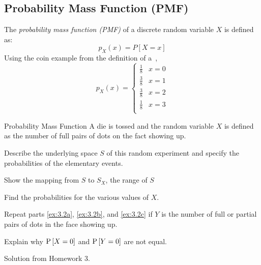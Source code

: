 	\subsection{Probability Mass Function  (PMF)} \label{subsec:Probability Mass Function}
		\begin{definition} \label{def:Probability Mass Function}
			The \emph{probability mass function (PMF)} of a discrete random variable $X$ is defined as:
			\begin{equation} \label{eq:Probability Mass Function}
				p_{X} \left( x \right) = P \left[ X=x \right]
			\end{equation}
			Using the coin example from the definition of a~,
			\begin{equation}
				p_{X} \left( x \right) = 
				\begin{cases}
					\frac{1}{8} & x=0 \\
					\frac{3}{8} & x=1 \\
					\frac{3}{8} & x=2 \\
					\frac{1}{8} & x=3 \\
				\end{cases}
			\end{equation}
		\end{definition}
		\begin{example}[Problem 3.2]{Probability Mass Function}
		A die is tossed and the random variable $X$ is defined as the number of full pairs of dots on the fact showing up.
			\begin{boldalphlist}[label=\textbf{(\alph*)}, ref=(\alph*)]
				\item Describe the underlying space $S$ of this random experiment and specify the probabilities of the elementary events. \label{ex:3.2a}
				\item Show the mapping from $S$ to $S_{X}$, the range of $S$ \label{ex:3.2b}
				\item Find the probabilities for the various values of $X$. \label{ex:3.2c}
				\item Repeat parts \ref{ex:3.2a}, \ref{ex:3.2b}, and \ref{ex:3.2c} if $Y$ is the number of full or partial pairs of dots in the face showing up.
				\item Explain why $\operatorname{\operatorname{P}} \left[ X = 0 \right]$ and $\operatorname{\operatorname{P}} \left[ Y = 0 \right]$ are not equal.
			\end{boldalphlist}
		
		\tcblower
		
		Solution from Homework 3.
		\end{example}
		
